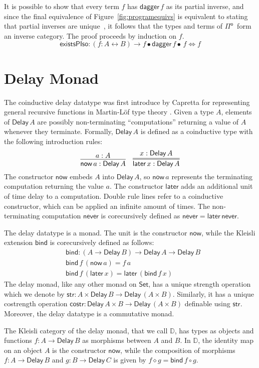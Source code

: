 \documentclass[runningheads,a4paper]{llncs}
\newcommand{\Pio}{\ensuremath{\mathsf{\Pi}^{\mathsf{o}}}}
\newcommand{\Set}{\mathsf{Set}}
\newcommand{\comp}{\circ}
\newcommand{\lr}{\longleftrightarrow}
\newcommand{\LR}{\iff}
\renewcommand{\dagger}{\mathsf{dagger}}
\newcommand{\Delay}{\ensuremath{\mathsf{Delay}\,}}
\newcommand{\now}{\mathsf{now}}
\newcommand{\later}{\mathsf{later}}
\newcommand{\never}{\mathsf{never}}
\newcommand{\bind}{\mathsf{bind}}
\newcommand{\str}{\mathsf{str}}
\newcommand{\costr}{\mathsf{costr}}
\newcommand{\D}{\mathbb{D}}
\begin{document}
It is possible to show that every term $f$ has $\dagger\,f$ as its partial
inverse, and since the final equivalence of Figure~\ref{fig:programequivs} is
equivalent to stating that partial inverses are unique~\cite{Kastl79}, it
follows that the types and terms of \Pio\ form an inverse category. The proof
proceeds by induction on $f$.
\[
\mathsf{existsPIso} : (f : A \lr B) \to f \bullet \dagger\,f
\bullet\,f \LR f
\]

\section{Delay Monad}\label{sec:delay}

The coinductive delay datatype was first introduce by Capretta for
representing general recursive functions in Martin-L\"of type theory
\cite{Capretta05}.  Given a type $A$, elements of $\Delay A$ are
possibly non-terminating ``computations'' returning a value of $A$
whenever they terminate. Formally, $\Delay A$ is defined as a
coinductive type with the following introduction rules:
\[
\infer{\now\,a : \Delay A}{a : A}
\quad
\infer={\later\,x : \Delay A}{x : \Delay A}
\]
The constructor $\now$ embeds $A$ into $\Delay A$, so $\now\,a$
represents the terminating computation returning the value $a$. The
constructor $\later$ adds an additional unit of time delay to a
computation. Double rule lines refer to a coinductive constructor,
which can be applied an infinite amount of times.
The non-terminating computation $\never$
is corecursively defined as $\never = \later \,\never$.

The delay datatype is a monad. The unit is the constructor $\now$,
while the Kleisli extension $\bind$ is corecursively defined as follows:
\begin{align*}
& \bind : (A \to \Delay B) \to \Delay A \to \Delay B \\
& \bind \,f \, (\now\,a) = f\,a \\
& \bind\,f\,(\later\,x) = \later\,(\bind\,f\,x)
\end{align*}
The delay monad, like any other monad on $\Set$, has a unique strength
operation which we denote by $\str : A \times \Delay B \to \Delay (A
\times B)$. Similarly, it has a unique costrength operation $\costr :
\Delay A \times B \to \Delay (A \times B)$ definable using $\str$. Moreover, the delay datatype is a commutative monad.

The Kleisli category of the delay monad, that we call $\D$, has types
as objects and functions $f : A \to \Delay B$ as morphisms between $A$
and $B$. In $\D$, the identity map on an object $A$ is the constructor
$\now$, while the composition of morphisms $f : A \to \Delay B$ and $g
: B \to \Delay C$ is given by $f \diamond g = \bind\,f \comp g$.
\end{document}
